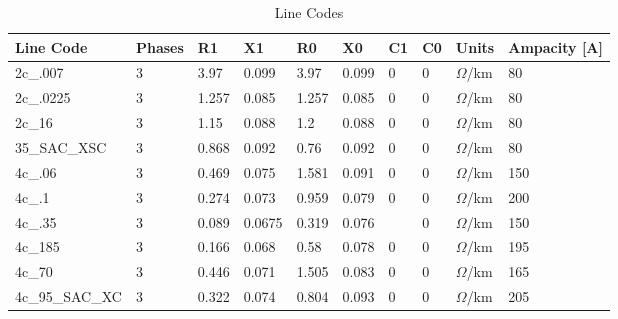 \begin{table}[]
	\centering
	\small
	\caption{Line Codes}
	\label{tab:linecodes}
	\begin{tabular}{@{}llllllllll@{}}
		\toprule
		Line Code       & Phases & R1    & X1     & R0    & X0    & C1 & C0 & Units       & Ampacity {[}A{]} \\ \midrule
		2c\_.007        & 3      & 3.97  & 0.099  & 3.97  & 0.099 & 0  & 0  & $\Omega$/km & 80               \\
		2c\_.0225       & 3      & 1.257 & 0.085  & 1.257 & 0.085 & 0  & 0  & $\Omega$/km & 80               \\
		2c\_16          & 3      & 1.15  & 0.088  & 1.2   & 0.088 & 0  & 0  & $\Omega$/km & 80               \\
		35\_SAC\_XSC    & 3      & 0.868 & 0.092  & 0.76  & 0.092 & 0  & 0  & $\Omega$/km & 80               \\
		4c\_.06         & 3      & 0.469 & 0.075  & 1.581 & 0.091 & 0  & 0  & $\Omega$/km & 150              \\
		4c\_.1          & 3      & 0.274 & 0.073  & 0.959 & 0.079 & 0  & 0  & $\Omega$/km & 200              \\
		4c\_.35         & 3      & 0.089 & 0.0675 & 0.319 & 0.076 &    & 0  & $\Omega$/km & 150              \\
		4c\_185         & 3      & 0.166 & 0.068  & 0.58  & 0.078 & 0  & 0  & $\Omega$/km & 195              \\
		4c\_70          & 3      & 0.446 & 0.071  & 1.505 & 0.083 & 0  & 0  & $\Omega$/km & 165              \\
		4c\_95\_SAC\_XC & 3      & 0.322 & 0.074  & 0.804 & 0.093 & 0  & 0  & $\Omega$/km & 205              \\ \bottomrule
	\end{tabular}
\end{table}